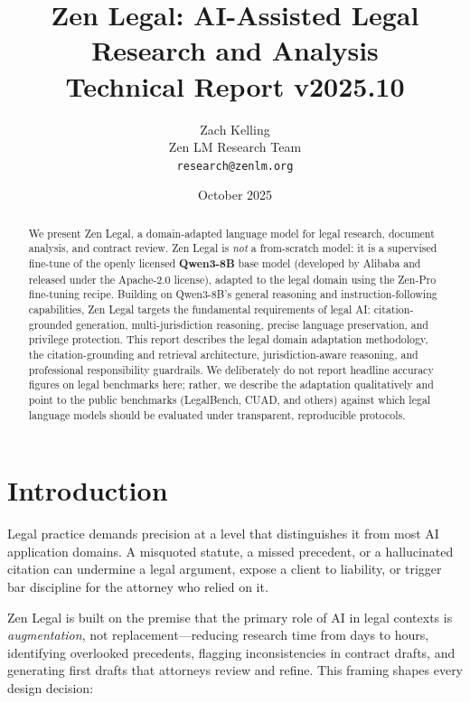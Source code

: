 \documentclass[11pt,a4paper]{article}
\title{\textbf{Zen Legal: AI-Assisted Legal Research and Analysis}\\
\large Technical Report v2025.10}
\author{Zach Kelling \\ Zen LM Research Team\\
\texttt{research@zenlm.org}}
\date{October 2025}
\begin{document}
\maketitle

\begin{abstract}
We present Zen Legal, a domain-adapted language model for legal research, document analysis, and contract review. Zen Legal is \emph{not} a from-scratch model: it is a supervised fine-tune of the openly licensed \textbf{Qwen3-8B} base model (developed by Alibaba and released under the Apache-2.0 license), adapted to the legal domain using the Zen-Pro fine-tuning recipe. Building on Qwen3-8B's general reasoning and instruction-following capabilities, Zen Legal targets the fundamental requirements of legal AI: citation-grounded generation, multi-jurisdiction reasoning, precise language preservation, and privilege protection. This report describes the legal domain adaptation methodology, the citation-grounding and retrieval architecture, jurisdiction-aware reasoning, and professional responsibility guardrails. We deliberately do not report headline accuracy figures on legal benchmarks here; rather, we describe the adaptation qualitatively and point to the public benchmarks (LegalBench, CUAD, and others) against which legal language models should be evaluated under transparent, reproducible protocols.
\end{abstract}

\section{Introduction}

Legal practice demands precision at a level that distinguishes it from most AI application domains. A misquoted statute, a missed precedent, or a hallucinated citation can undermine a legal argument, expose a client to liability, or trigger bar discipline for the attorney who relied on it.

Zen Legal is built on the premise that the primary role of AI in legal contexts is \emph{augmentation}, not replacement—reducing research time from days to hours, identifying overlooked precedents, flagging inconsistencies in contract drafts, and generating first drafts that attorneys review and refine. This framing shapes every design decision:
\end{document}
